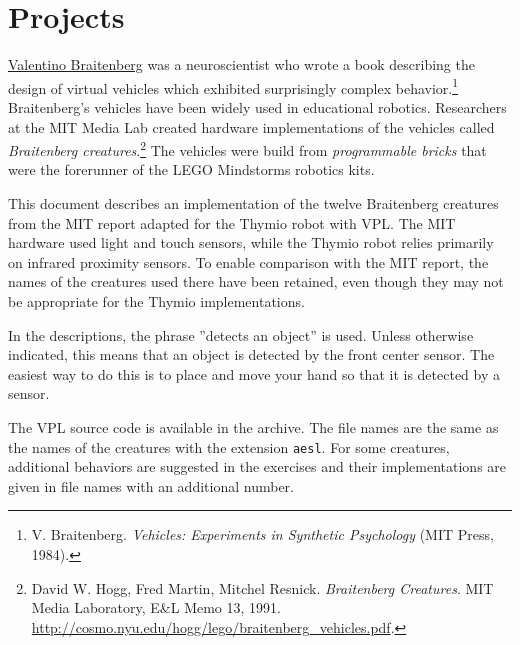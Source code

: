 \part{Projects}

\label{ch.brait}


\href{http://en.wikipedia.org/wiki/Valentino_Braitenberg}{Valentino
Braitenberg} was a neuroscientist who wrote a book describing
the design of virtual vehicles which exhibited surprisingly complex
behavior.\footnote{V. Braitenberg. \textit{Vehicles: Experiments in
Synthetic Psychology} (MIT Press, 1984).} Braitenberg's vehicles have
been widely used in educational robotics. Researchers at the MIT Media
Lab created hardware implementations of the vehicles called
\emph{Braitenberg creatures}.\footnote{David W. Hogg, Fred Martin,
Mitchel Resnick. \textit{Braitenberg Creatures}. MIT Media Laboratory,
E\&L Memo 13, 1991.
\url{http://cosmo.nyu.edu/hogg/lego/braitenberg_vehicles.pdf}.} The
vehicles were build from \emph{programmable bricks} that were the
forerunner of the LEGO Mindstorms robotics kits.

This document describes an implementation of the twelve Braitenberg
creatures from the MIT report adapted for the Thymio robot with VPL. The
MIT hardware used light and touch sensors, while the Thymio robot relies
primarily on infrared proximity sensors. To enable comparison with the
MIT report, the names of the creatures used there have been retained,
even though they may not be appropriate for the Thymio implementations.

In the descriptions, the phrase ''detects an object'' is used. Unless
otherwise indicated, this means that an object is detected by the front
center sensor. The easiest way to do this is to place and move your hand
so that it is detected by a sensor.

The \textsc{VPL} source code is available in the archive. The file names
are the same as the names of the creatures with the extension
\texttt{\small aesl}. For some creatures, additional behaviors are
suggested in the exercises and their implementations are given in file
names with an additional number.


